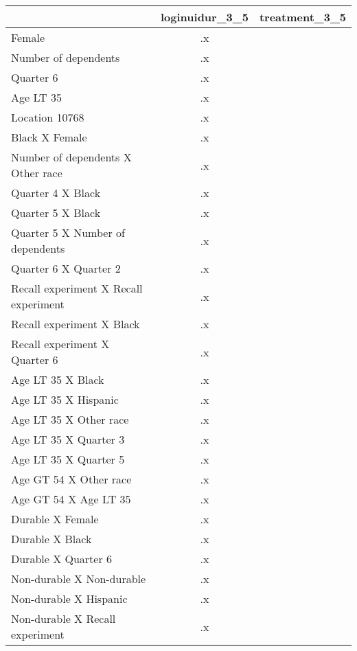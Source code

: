 \begin{tabular}{l*{2}{c}}
\hline\hline
                    &loginuidur\_3\_5&treatment\_3\_5\\
\hline
Female              &          .x&            \\
Number of dependents&          .x&            \\
Quarter 6           &          .x&            \\
Age LT 35           &          .x&            \\
Location 10768      &          .x&            \\
Black X Female      &          .x&            \\
Number of dependents X Other race&          .x&            \\
Quarter 4 X Black   &          .x&            \\
Quarter 5 X Black   &          .x&            \\
Quarter 5 X Number of dependents&          .x&            \\
Quarter 6 X Quarter 2&          .x&            \\
Recall experiment X Recall experiment&          .x&            \\
Recall experiment X Black&          .x&            \\
Recall experiment X Quarter 6&          .x&            \\
Age LT 35 X Black   &          .x&            \\
Age LT 35 X Hispanic&          .x&            \\
Age LT 35 X Other race&          .x&            \\
Age LT 35 X Quarter 3&          .x&            \\
Age LT 35 X Quarter 5&          .x&            \\
Age GT 54 X Other race&          .x&            \\
Age GT 54 X Age LT 35&          .x&            \\
Durable X Female    &          .x&            \\
Durable X Black     &          .x&            \\
Durable X Quarter 6 &          .x&            \\
Non-durable X Non-durable&          .x&            \\
Non-durable X Hispanic&          .x&            \\
Non-durable X Recall experiment&          .x&            \\

\end{tabular}
